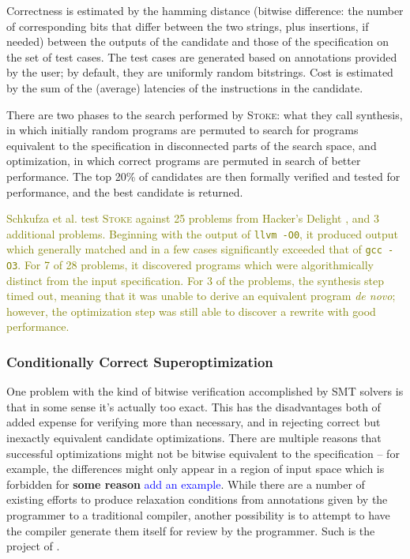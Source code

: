 \documentclass[12pt,twoside]{reedthesis}
\newcommand{\green}[1]{\textcolor{olive}{#1}}
\newcommand{\comment}[2]{\textbf{#1} \textcolor{blue}{#2}}
\begin{document}
        Correctness is estimated by the hamming distance (bitwise difference: the number of corresponding bits that differ between the two strings, plus insertions, if needed) between the outputs of the candidate and those of the specification on the set of test cases.
        The test cases are generated based on annotations provided by the user; by default, they are uniformly random bitstrings.
        Cost is estimated by the sum of the (average) latencies of the instructions in the candidate.
            
        There are two phases to the search performed by \textsc{Stoke}:
            what they call synthesis, in which initially random programs are permuted to search for programs equivalent to the specification in disconnected parts of the search space,
            and optimization, in which correct programs are permuted in search of better performance.
        The top 20\% of candidates are then formally verified and tested for performance, and the best candidate is returned.
            
        \green{
        Schkufza et al. test \textsc{Stoke} against 25 problems from Hacker's Delight \cite{warren2013hackers}, and 3 additional problems. 
        Beginning with the output of \texttt{llvm -O0}, it produced output which generally matched and in a few cases significantly exceeded that of \texttt{gcc -O3}.
        For 7 of 28 problems, it discovered programs which were algorithmically distinct from the input specification.
        For 3 of the problems, the synthesis step timed out, meaning that it was unable to derive an equivalent program \textit{de novo}; however, the optimization step was still able to discover a rewrite with good performance.
        }

    \subsubsection{Conditionally Correct Superoptimization}
        One problem with the kind of bitwise verification accomplished by SMT solvers is that in some sense it's actually too exact.
        This has the disadvantages both of added expense for verifying more than necessary, and in rejecting correct but inexactly equivalent candidate optimizations.
        There are multiple reasons that successful optimizations might not be bitwise equivalent to the specification
            -- for example, the differences might only appear in a region of input space which is forbidden for \comment{some reason}{add an example}.
        While there are a number of existing efforts to produce relaxation conditions from annotations given by the programmer to a traditional compiler, another possibility is to attempt to have the compiler generate them itself for review by the programmer.
        Such is the project of \cite{sharma2015conditionally}.
            
\end{document}
